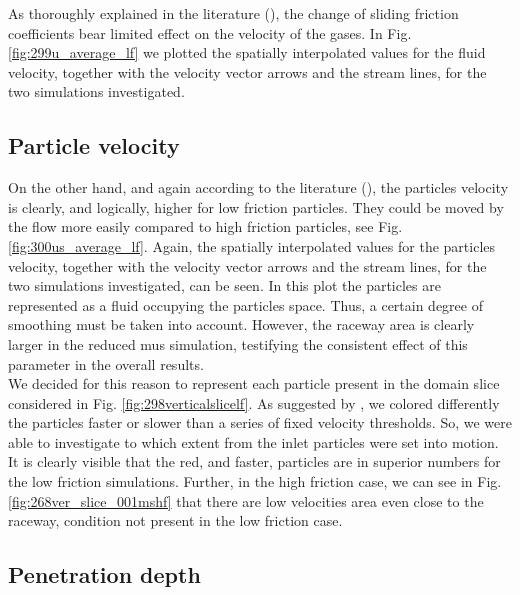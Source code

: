 As thoroughly explained in the literature (\cite{RefWorks:198, RefWorks:199}),
the change of sliding friction coefficients bear limited effect on the velocity
of the gases. In Fig. \ref{fig:299u_average_lf} we plotted the spatially
interpolated values for the fluid velocity, together with the velocity vector
arrows and the stream lines, for the two simulations investigated.



\subsection{Particle velocity}
\label{subsec:particlevelocity}

On the other hand, and again according to the literature (\cite{RefWorks:198,
RefWorks:199}), the particles velocity is clearly, and logically, higher for low friction particles. 
They could be moved by the flow more easily compared to high
friction particles, see Fig. \ref{fig:300us_average_lf}.
Again, the spatially
interpolated values for the particles velocity, together with the velocity
vector arrows and the stream lines, for the two simulations investigated, can be seen.
In this plot the particles are represented as a fluid occupying the particles
space. 
Thus, a certain degree of smoothing must be taken into account.
However, the raceway area is clearly larger in the reduced \acs{mus}
simulation, testifying the consistent effect of this parameter in the overall
results. \\



We decided for this reason to represent each particle present in the domain
slice considered in Fig. \ref{fig:298verticalslicelf}.
As suggested by \citet{RefWorks:208}, we colored differently the particles
faster or slower than a series of fixed velocity thresholds. 
So, we were able to investigate to which extent
from the inlet particles were set into motion.\\
It is clearly visible that the red, and faster, particles are in superior
numbers for the low friction simulations.
Further, in the high friction case, we can see in Fig.
\ref{fig:268ver_slice_001mshf} that there are low velocities area even close to
the raceway, condition not present in the low friction case.



\subsection{Penetration depth}
\label{subsec:penetrationdepth}

